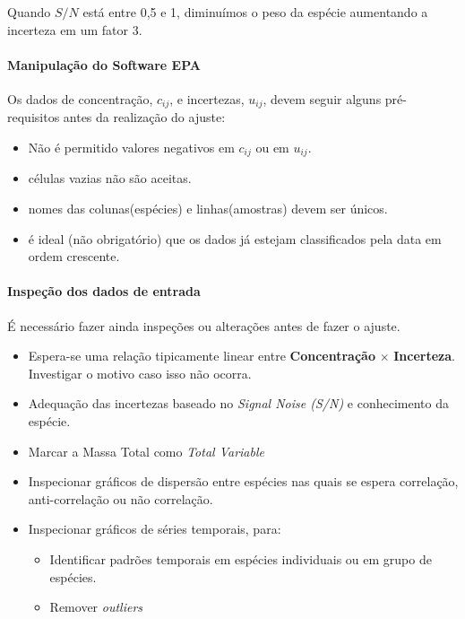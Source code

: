 Quando $S/N$ está entre 0,5 e 1, diminuímos o peso da espécie aumentando a 
incerteza em um fator 3.  

\paragraph{Manipulação do Software EPA}

Os dados de concentração, $c_{ij}$, e incertezas, $u_{ij}$, devem seguir 
alguns pré-requisitos antes da realização do ajuste:

\begin{itemize}
  \item Não é permitido valores negativos em $c_{ij}$ ou em $u_{ij}$.
  \item células vazias não são aceitas.
  \item nomes das colunas(espécies) e linhas(amostras) devem ser únicos.
  \item é ideal (não obrigatório) que os dados já estejam classificados 
        pela data em ordem crescente.
\end{itemize}

\paragraph{Inspeção dos dados de entrada}

É necessário fazer ainda inspeções ou alterações antes de fazer o ajuste.
\begin{itemize}
  \item Espera-se uma relação tipicamente linear entre 
        \textbf{Concentração} $\times$ \textbf{Incerteza}.  
        Investigar o motivo caso isso não ocorra. 
  \item Adequação das incertezas baseado no \textit{Signal Noise (S/N)} e 
        conhecimento da espécie. 
  \item Marcar a Massa Total como \textit{Total Variable}
  \item Inspecionar gráficos de dispersão entre espécies nas quais se espera 
        correlação, anti-correlação ou não correlação. 
  \item Inspecionar gráficos de séries temporais, para:
    \begin{itemize}
      \item Identificar padrões temporais em espécies individuais ou em grupo 
            de espécies.
      \item Remover \textit{outliers} 
    \end{itemize}
\end{itemize}

